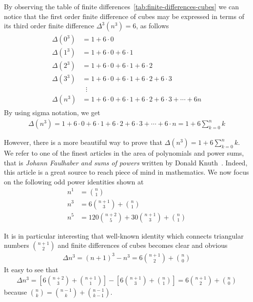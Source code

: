 By observing the table of finite differences~\eqref{tab:finite-differences-cubes} we can notice that
the first order finite difference of cubes may be expressed in terms of its
third order finite difference $\Delta^3(n^3) = 6$, as follows
\begin{align*}
    \begin{split}
        \Delta(0^3) &= 1+6 \cdot 0 \\
        \Delta(1^3) &= 1+6\cdot0+6\cdot1 \\
        \Delta(2^3) &= 1+6\cdot0+6\cdot1+6\cdot2 \\
        \Delta(3^3) &= 1+6\cdot0+6\cdot1+6\cdot2+6\cdot3 \\
        &\; \; \vdots \\
        \Delta(n^3) &= 1+6\cdot0+6\cdot1+6\cdot2+6\cdot3 + \cdots + 6n
    \end{split}
\end{align*}
By using sigma notation, we get
\begin{align*}
    \Delta(n^3) = 1+6\cdot0+6\cdot1+6\cdot2+6\cdot3+\cdots+6\cdot n = 1 + 6 \sum_{k=0}^{n} k
\end{align*}

However, there is a more beautiful way to prove that $\Delta(n^3) = 1 + 6 \sum_{k=0}^{n} k$.
We refer to one of the finest articles in the area of polynomials and power sums,
that is \textit{Johann Faulhaber and sums of powers} written by Donald Knuth~\cite{knuth1993johann}.
Indeed, this article is a great source to reach piece of mind in mathematics.
We now focus on the following odd power identities shown at~\cite[~p. 9]{knuth1993johann}
\begin{align*}
    n^1 &= \binom{n}{1} \\
    n^3 &= 6 \binom{n+1}{3} + \binom{n}{1} \\
    n^5 &= 120 \binom{n+2}{5} + 30 \binom{n+1}{3} + \binom{n}{1}
\end{align*}

It is in particular interesting that well-known identity which connects triangular numbers $\binom{n+1}{2}$
and finite differences of cubes becomes clear and obvious
\begin{align*}
    \Delta n^3
    = (n+1)^3 - n^3
    =  6 \binom{n+1}{2} + \binom{n}{0}
\end{align*}
It easy to see that
\begin{align*}
    \Delta n^3
    = \left[ 6 \binom{n+2}{3} + \binom{n+1}{1} \right] - \left[ 6 \binom{n+1}{3} + \binom{n}{1} \right]
    = 6 \binom{n+1}{2} + \binom{n}{0}
\end{align*}
because $\binom{n}{k} = \binom{n-1}{k} + \binom{n-1}{k-1}$.

